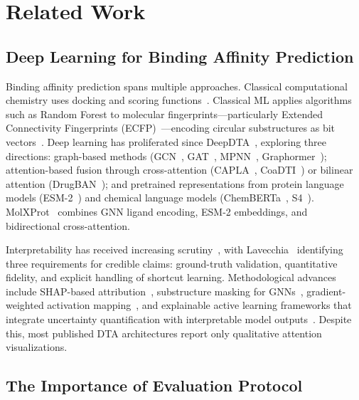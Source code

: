 \documentclass[pmlr,twocolumn]{jmlr}
\begin{document}
\section{Related Work}

\subsection{Deep Learning for Binding Affinity Prediction}

Binding affinity prediction spans multiple approaches. Classical computational chemistry uses docking and scoring functions~\citep{kitchen2004docking}. Classical ML applies algorithms such as Random Forest to molecular fingerprints---particularly Extended Connectivity Fingerprints (ECFP)~\citep{rogers2010ecfp}---encoding circular substructures as bit vectors~\citep{svetnik2003rf}. Deep learning has proliferated since DeepDTA~\citep{ozturk2018deepdta}, exploring three directions: graph-based methods (GCN~\citep{kipf2017gcn}, GAT~\citep{velickovic2018gat}, MPNN~\citep{gilmer2017mpnn}, Graphormer~\citep{ying2021graphormer}); attention-based fusion through cross-attention (CAPLA~\citep{capla2023}, CoaDTI~\citep{coadti2022}) or bilinear attention (DrugBAN~\citep{attentionmgt2024}); and pretrained representations from protein language models (ESM-2~\citep{lin2023esm2}) and chemical language models (ChemBERTa~\citep{ahmad2022chemberta}, S4~\citep{ozcelik2024s4}). MolXProt~\citep{cucco2026molxprot} combines GNN ligand encoding, ESM-2 embeddings, and bidirectional cross-attention.

Interpretability has received increasing scrutiny~\citep{yang2019concepts,jimenez2021ai}, with Lavecchia~\citep{lavecchia2025xai} identifying three requirements for credible claims: ground-truth validation, quantitative fidelity, and explicit handling of shortcut learning. Methodological advances include SHAP-based attribution~\citep{danel2020shap}, substructure masking for GNNs~\citep{wang2023sme}, gradient-weighted activation mapping~\citep{yang2022mgraphdta}, and explainable active learning frameworks that integrate uncertainty quantification with interpretable model outputs~\citep{srivastava2026explainable}. Despite this, most published DTA architectures report only qualitative attention visualizations.

\subsection{The Importance of Evaluation Protocol}
\end{document}
